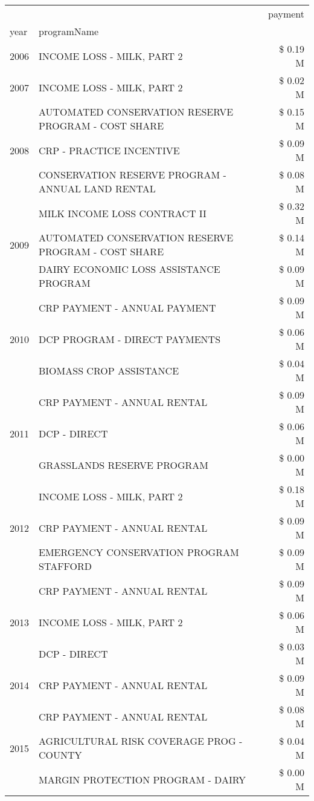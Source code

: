 \begin{tabular}{llr}
\toprule
 &  & payment \\
year & programName &  \\
\midrule
2006 & INCOME LOSS - MILK, PART 2 & \$ 0.19 M \\
\cline{1-3}
2007 & INCOME LOSS - MILK, PART 2 & \$ 0.02 M \\
\cline{1-3}
\multirow[t]{3}{*}{2008} & AUTOMATED CONSERVATION RESERVE PROGRAM - COST SHARE & \$ 0.15 M \\
 & CRP - PRACTICE INCENTIVE & \$ 0.09 M \\
 & CONSERVATION RESERVE PROGRAM - ANNUAL LAND RENTAL & \$ 0.08 M \\
\cline{1-3}
\multirow[t]{3}{*}{2009} & MILK INCOME LOSS CONTRACT II & \$ 0.32 M \\
 & AUTOMATED CONSERVATION RESERVE PROGRAM - COST SHARE & \$ 0.14 M \\
 & DAIRY ECONOMIC LOSS ASSISTANCE PROGRAM & \$ 0.09 M \\
\cline{1-3}
\multirow[t]{3}{*}{2010} & CRP PAYMENT - ANNUAL PAYMENT & \$ 0.09 M \\
 & DCP PROGRAM - DIRECT PAYMENTS & \$ 0.06 M \\
 & BIOMASS CROP ASSISTANCE & \$ 0.04 M \\
\cline{1-3}
\multirow[t]{3}{*}{2011} & CRP PAYMENT - ANNUAL RENTAL & \$ 0.09 M \\
 & DCP - DIRECT & \$ 0.06 M \\
 & GRASSLANDS RESERVE PROGRAM & \$ 0.00 M \\
\cline{1-3}
\multirow[t]{3}{*}{2012} & INCOME LOSS - MILK, PART 2 & \$ 0.18 M \\
 & CRP PAYMENT - ANNUAL RENTAL & \$ 0.09 M \\
 & EMERGENCY CONSERVATION PROGRAM STAFFORD & \$ 0.09 M \\
\cline{1-3}
\multirow[t]{3}{*}{2013} & CRP PAYMENT - ANNUAL RENTAL & \$ 0.09 M \\
 & INCOME LOSS - MILK, PART 2 & \$ 0.06 M \\
 & DCP - DIRECT & \$ 0.03 M \\
\cline{1-3}
2014 & CRP PAYMENT - ANNUAL RENTAL & \$ 0.09 M \\
\cline{1-3}
\multirow[t]{3}{*}{2015} & CRP PAYMENT - ANNUAL RENTAL & \$ 0.08 M \\
 & AGRICULTURAL RISK COVERAGE PROG - COUNTY & \$ 0.04 M \\
 & MARGIN PROTECTION PROGRAM - DAIRY & \$ 0.00 M \\

\end{tabular}
